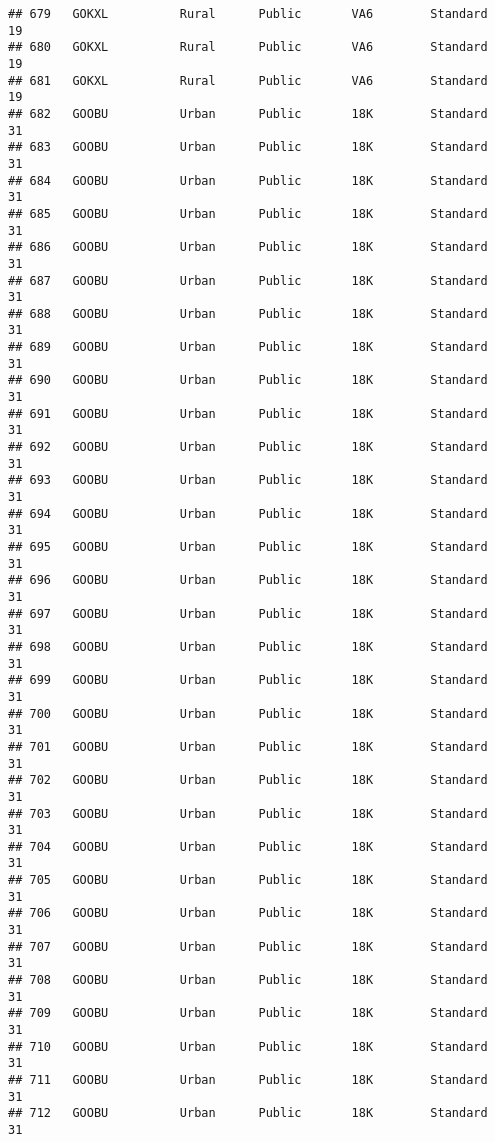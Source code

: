 \documentclass[
]{article}
\begin{document}
\begin{verbatim}
## 679   GOKXL          Rural      Public       VA6        Standard        19
## 680   GOKXL          Rural      Public       VA6        Standard        19
## 681   GOKXL          Rural      Public       VA6        Standard        19
## 682   GOOBU          Urban      Public       18K        Standard        31
## 683   GOOBU          Urban      Public       18K        Standard        31
## 684   GOOBU          Urban      Public       18K        Standard        31
## 685   GOOBU          Urban      Public       18K        Standard        31
## 686   GOOBU          Urban      Public       18K        Standard        31
## 687   GOOBU          Urban      Public       18K        Standard        31
## 688   GOOBU          Urban      Public       18K        Standard        31
## 689   GOOBU          Urban      Public       18K        Standard        31
## 690   GOOBU          Urban      Public       18K        Standard        31
## 691   GOOBU          Urban      Public       18K        Standard        31
## 692   GOOBU          Urban      Public       18K        Standard        31
## 693   GOOBU          Urban      Public       18K        Standard        31
## 694   GOOBU          Urban      Public       18K        Standard        31
## 695   GOOBU          Urban      Public       18K        Standard        31
## 696   GOOBU          Urban      Public       18K        Standard        31
## 697   GOOBU          Urban      Public       18K        Standard        31
## 698   GOOBU          Urban      Public       18K        Standard        31
## 699   GOOBU          Urban      Public       18K        Standard        31
## 700   GOOBU          Urban      Public       18K        Standard        31
## 701   GOOBU          Urban      Public       18K        Standard        31
## 702   GOOBU          Urban      Public       18K        Standard        31
## 703   GOOBU          Urban      Public       18K        Standard        31
## 704   GOOBU          Urban      Public       18K        Standard        31
## 705   GOOBU          Urban      Public       18K        Standard        31
## 706   GOOBU          Urban      Public       18K        Standard        31
## 707   GOOBU          Urban      Public       18K        Standard        31
## 708   GOOBU          Urban      Public       18K        Standard        31
## 709   GOOBU          Urban      Public       18K        Standard        31
## 710   GOOBU          Urban      Public       18K        Standard        31
## 711   GOOBU          Urban      Public       18K        Standard        31
## 712   GOOBU          Urban      Public       18K        Standard        31

\end{verbatim}
\end{document}
